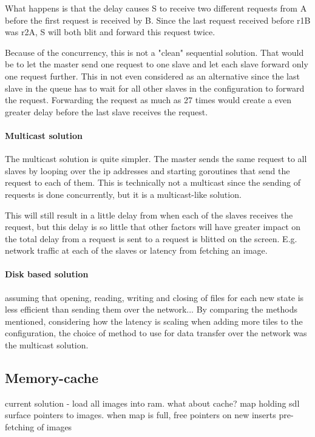 \documentclass[12pt, a4paper, oneside]{article}
\begin{document}
What happens is that the delay causes S to receive two different requests from A before the first request is received by B. Since the last request received before r1B was r2A, S will both blit and forward this request twice. 

Because of the concurrency, this is not a "clean" sequential solution. That would be to let the master send one request to one slave and let each slave forward only one request further. This in not even considered as an alternative since the last slave in the queue has to wait for all other slaves in the configuration to forward the request. Forwarding the request as much as 27 times would create a even greater delay before the last slave receives the request.

\paragraph{Multicast solution}
The multicast solution is quite simpler. The master sends the same request to all slaves by looping over the ip addresses and starting goroutines that send the request to each of them. This is technically not a multicast since the sending of requests is done concurrently, but it is a multicast-like solution.

This will still result in a little delay from when each of the slaves receives the request, but this delay is so little that other factors will have greater impact on the total delay from a request is sent to a request is blitted on the screen. E.g. network traffic at each of the slaves or latency from fetching an image.


\paragraph{Disk based solution}
assuming that opening, reading, writing and closing of files for each new state is less efficient than sending them over the network...
\newline
\newline
By comparing the methods mentioned, considering how the latency is scaling when adding more tiles to the configuration, the choice of method to use for data transfer over the network was the multicast solution. 

\subsection{Memory-cache}
current solution - load all images into ram. what about cache?
map holding sdl surface pointers to images. when map is full, free pointers on new inserts
pre-fetching of images
\newpage
\end{document}
